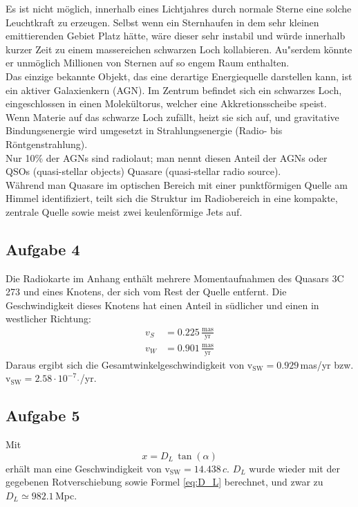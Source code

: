 \documentclass[12pt]{article}
\begin{document}
Es ist nicht m\"{o}glich, innerhalb eines Lichtjahres durch normale Sterne eine solche Leuchtkraft zu erzeugen. Selbst wenn ein Sternhaufen in dem sehr kleinen emittierenden Gebiet Platz h\"{a}tte, w\"{a}re dieser sehr instabil und w\"{u}rde innerhalb kurzer Zeit zu einem massereichen schwarzen Loch kollabieren. Au"serdem k\"{o}nnte er unm\"{o}glich Millionen von Sternen auf so engem Raum enthalten.\\ 
Das einzige bekannte Objekt, das eine derartige Energiequelle darstellen kann, ist ein aktiver Galaxienkern (AGN). Im Zentrum befindet sich ein schwarzes Loch, eingeschlossen in einen Molek\"{u}ltorus, welcher eine Akkretionsscheibe speist. Wenn Materie auf das schwarze Loch zuf\"{a}llt, heizt sie sich auf, und gravitative Bindungsenergie wird umgesetzt in Strahlungsenergie (Radio- bis R\"{o}ntgenstrahlung). \\
Nur 10\% der AGNs sind radiolaut; man nennt diesen Anteil der AGNs oder QSOs (quasi-stellar objects) Quasare (quasi-stellar radio source).  \\
W\"{a}hrend man Quasare im optischen Bereich mit einer punktf\"{o}rmigen Quelle am Himmel identifiziert, teilt sich die Struktur im Radiobereich in eine kompakte, zentrale Quelle sowie meist zwei keulenf\"{o}rmige Jets auf. \\

\subsection{Aufgabe 4}

Die Radiokarte im Anhang enth\"{a}lt mehrere Momentaufnahmen des Quasars 3C 273 und eines Knotens, der sich vom Rest der Quelle entfernt. Die Geschwindigkeit dieses Knotens hat einen Anteil in s\"{u}dlicher und einen in westlicher Richtung:
\begin{align*}
	v_S&=0.225\,\frac{\text{mas}}{\text{yr}}\\
	v_W&=0.901\,\frac{\text{mas}}{\text{yr}}
\end{align*}
Daraus ergibt sich die Gesamtwinkelgeschwindigkeit von v$_\text{SW}=0.929\,$mas/yr bzw. v$_\text{SW}=2.58\cdot 10^{-7}$\,\,$\mathring{}$/yr. 

\subsection{Aufgabe 5}

Mit
\begin{equation*}
	x=D_L\,\tan(\alpha)
\end{equation*}
erh\"{a}lt man eine Geschwindigkeit von v$_\text{SW}=14.438\,c$. $D_L$ wurde wieder mit der gegebenen Rotverschiebung sowie Formel \ref{eq:D_L} berechnet, und zwar zu $D_L\simeq982.1$\,Mpc.
\end{document}
